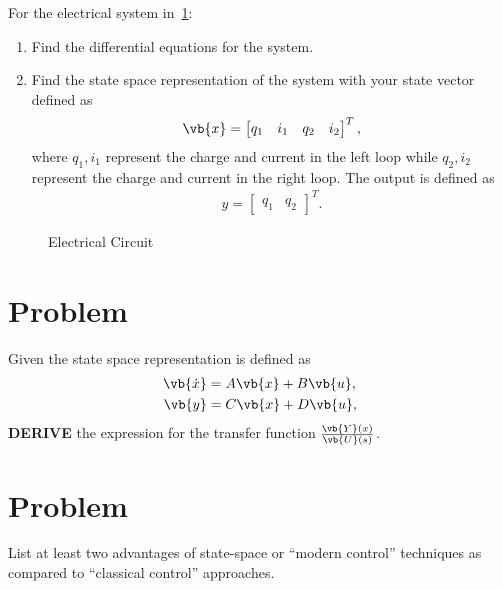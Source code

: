 \documentclass[11pt, reqno]{article}    %
\begin{document}
For the electrical system in~\cref{fig:elec_circuit_2}:
\begin{enumerate}
    \item Find the differential equations for the system.
    \item Find the state space representation of the system with your state vector defined as
        \begin{align*}
        \vb{x} = \begin{bmatrix}q_1 & i_1 & q_2 & i_2\end{bmatrix}^T,
        \end{align*}
        where \(q_1, i_1\) represent the charge and current in the left loop while \(q_2, i_2\) represent the charge and current in the right loop. 
        The output is defined as
        \begin{align*}
        y = \begin{bmatrix} q_1 & q_2 \end{bmatrix}^T.
        \end{align*}
\end{enumerate}
\begin{figure}[htbp]
\centering
\begin{scaletikzpicturetowidth}{0.8\textwidth}
\end{scaletikzpicturetowidth}
\caption{Electrical Circuit~\label{fig:elec_circuit_2}}
\end{figure}
\clearpage

\section{Problem}
Given the state space representation is defined as
\begin{align*}
    \vb{\dot{x}} &= A \vb{x} + B \vb{u}, \\
    \vb{y} &= C \vb{x} + D\vb{u},
\end{align*}
\textbf{DERIVE} the expression for the transfer function \(\frac{\vb{Y}(x)}{\vb{U}(s)}\).
\vspace{13cm}
\section{Problem}

List at least two advantages of state-space or ``modern control'' techniques as compared to ``classical control'' approaches.
\vspace{5cm}
\clearpage
\end{document}
